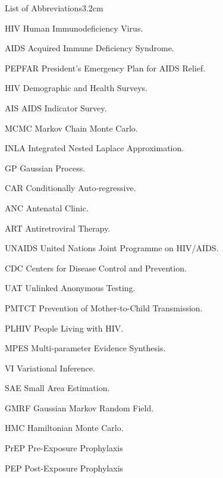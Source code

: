 

\begin{mclistof}{List of Abbreviations}{3.2cm}

\item[HIV] Human Immunodeficiency Virus.
\item[AIDS] Acquired Immune Deficiency Syndrome.
\item[PEPFAR] President’s Emergency Plan for AIDS Relief.
\item[HIV] Demographic and Health Surveys.
\item[AIS] AIDS Indicator Survey.
\item[MCMC] Markov Chain Monte Carlo.
\item[INLA] Integrated Nested Laplace Approximation.
\item[GP] Gaussian Process.
\item[CAR] Conditionally Auto-regressive.
\item[ANC] Antenatal Clinic.
\item[ART] Antiretroviral Therapy.
\item[UNAIDS] United Nations Joint Programme on HIV/AIDS.
\item[CDC] Centers for Disease Control and Prevention.
\item[UAT] Unlinked Anonymous Testing.
\item[PMTCT] Prevention of Mother-to-Child Transmission.
\item[PLHIV] People Living with HIV.
\item[MPES] Multi-parameter Evidence Synthesis.
\item[VI] Variational Inference.
\item[SAE] Small Area Estimation.
\item[GMRF] Gaussian Markov Random Field.
\item[HMC] Hamiltonian Monte Carlo.
\item[PrEP] Pre-Exposure Prophylaxis
\item[PEP] Post-Exposure Prophylaxis

\end{mclistof} 
